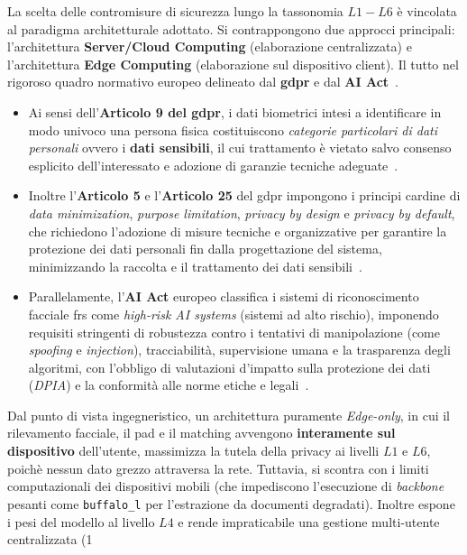 La scelta delle contromisure di sicurezza lungo la tassonomia $L1-L6$ è vincolata al paradigma architetturale adottato. Si contrappongono due approcci principali: l'architettura \textbf{Server/Cloud Computing} (elaborazione centralizzata) e l'architettura \textbf{Edge Computing} (elaborazione sul dispositivo client). Il tutto nel rigoroso quadro normativo europeo delineato dal \textbf{\gls{gdpr}} e dal \textbf{AI Act}~\cite{sanzGoverningPrivacyPreservingFace2026}.
\begin{itemize}
    \item Ai sensi dell'\textbf{Articolo 9 del \gls{gdpr}}, i dati biometrici intesi a identificare in modo univoco una persona fisica costituiscono \textit{categorie particolari di dati personali} ovvero i \textbf{dati sensibili}, il cui trattamento è vietato salvo consenso esplicito dell'interessato e adozione di garanzie tecniche adeguate~\cite{REGOLAMENTOUE2016}.
    \item Inoltre l'\textbf{Articolo 5} e l'\textbf{Articolo 25} del \gls{gdpr} impongono i principi cardine di \textit{data minimization}, \textit{purpose limitation}, \textit{privacy by design} e \textit{privacy by default}, che richiedono l'adozione di misure tecniche e organizzative per garantire la protezione dei dati personali fin dalla progettazione del sistema, minimizzando la raccolta e il trattamento dei dati sensibili~\cite{REGOLAMENTOUE2016}.
    \item Parallelamente, l'\textbf{AI Act} europeo classifica i sistemi di riconoscimento facciale \gls{frs} come \textit{high-risk AI systems} (sistemi ad alto rischio), imponendo requisiti stringenti di robustezza contro i tentativi di manipolazione (come \textit{spoofing} e \textit{injection}), tracciabilità, supervisione umana e la trasparenza degli algoritmi, con l'obbligo di valutazioni d'impatto sulla protezione dei dati (\textit{DPIA}) e la conformità alle norme etiche e legali~\cite{sanzGoverningPrivacyPreservingFace2026}.
\end{itemize}
Dal punto di vista ingegneristico, un architettura puramente \textit{Edge-only}, in cui il rilevamento facciale, il \gls{pad} e il matching avvengono \textbf{interamente sul dispositivo} dell'utente, massimizza la tutela della privacy ai livelli $L1$ e $L6$, poichè nessun dato grezzo attraversa la rete. Tuttavia, si scontra con i limiti computazionali dei dispositivi mobili (che impediscono l'esecuzione di \textit{backbone} pesanti come \texttt{buffalo\_l} per l'estrazione da documenti degradati). Inoltre espone i pesi del modello al livello $L4$ e rende impraticabile una gestione multi-utente centralizzata (1
